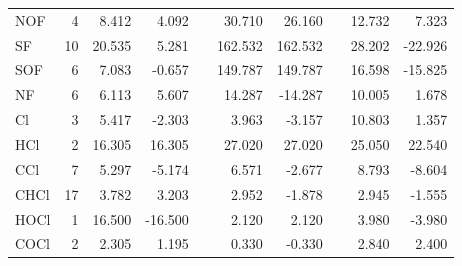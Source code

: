 \begin{table}
\begin{center}
\begin{tabular}{lrrrrrrrrr}
      NOF     &      4 &    8.412 &    4.092 &  &   30.710 &   26.160 &  &   12.732 &    7.323 \\
      SF      &     10 &   20.535 &    5.281 &  &  162.532 &  162.532 &  &   28.202 &  -22.926 \\
      SOF     &      6 &    7.083 &   -0.657 &  &  149.787 &  149.787 &  &   16.598 &  -15.825 \\
      NF      &      6 &    6.113 &    5.607 &  &   14.287 &  -14.287 &  &   10.005 &    1.678 \\
      Cl      &      3 &    5.417 &   -2.303 &  &    3.963 &   -3.157 &  &   10.803 &    1.357 \\
      HCl     &      2 &   16.305 &   16.305 &  &   27.020 &   27.020 &  &   25.050 &   22.540 \\
      CCl     &      7 &    5.297 &   -5.174 &  &    6.571 &   -2.677 &  &    8.793 &   -8.604 \\
      CHCl    &     17 &    3.782 &    3.203 &  &    2.952 &   -1.878 &  &    2.945 &   -1.555 \\
      HOCl    &      1 &   16.500 &  -16.500 &  &    2.120 &    2.120 &  &    3.980 &   -3.980 \\
      COCl    &      2 &    2.305 &    1.195 &  &    0.330 &   -0.330 &  &    2.840 &    2.400 \\
\hline
\end{tabular}
\end{center}
\end{table}

